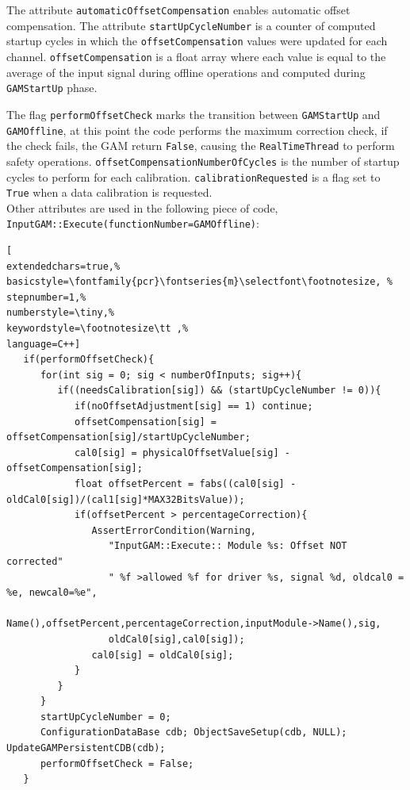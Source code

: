 The attribute \texttt{automaticOffsetCompensation} enables automatic offset compensation. The attribute \texttt{startUpCycleNumber} is a counter of computed startup cycles in which the \texttt{offsetCompensation} values were updated for each channel. \texttt{offsetCompensation} is a float array where each value is equal to the average of the input signal during offline operations and computed during \texttt{GAMStartUp} phase.

The flag \texttt{performOffsetCheck} marks the transition between \texttt{GAMStartUp} and \texttt{GAMOffline}, at this point the code performs the maximum correction check, if the check fails, the GAM return \texttt{False}, causing the \texttt{RealTimeThread} to perform safety operations. \texttt{offsetCompensationNumberOfCycles} is the number of startup cycles to perform for each calibration. \texttt{calibrationRequested} is a flag set to \texttt{True} when a data calibration is requested. \\


Other attributes are used in the following piece of code, \texttt{InputGAM::Execute(functionNumber=GAMOffline)}:

\begin{lstlisting}[
extendedchars=true,%
basicstyle=\fontfamily{pcr}\fontseries{m}\selectfont\footnotesize, %
stepnumber=1,%
numberstyle=\tiny,%
keywordstyle=\footnotesize\tt ,%
language=C++]
   if(performOffsetCheck){
      for(int sig = 0; sig < numberOfInputs; sig++){
         if((needsCalibration[sig]) && (startUpCycleNumber != 0)){ 
            if(noOffsetAdjustment[sig] == 1) continue;
            offsetCompensation[sig] = offsetCompensation[sig]/startUpCycleNumber;
            cal0[sig] = physicalOffsetValue[sig] - offsetCompensation[sig];
            float offsetPercent = fabs((cal0[sig] - oldCal0[sig])/(cal1[sig]*MAX32BitsValue));
            if(offsetPercent > percentageCorrection){
               AssertErrorCondition(Warning,
                  "InputGAM::Execute:: Module %s: Offset NOT corrected"
                  " %f >allowed %f for driver %s, signal %d, oldcal0 = %e, newcal0=%e",
                  Name(),offsetPercent,percentageCorrection,inputModule->Name(),sig,
                  oldCal0[sig],cal0[sig]);
               cal0[sig] = oldCal0[sig];
            }
         }
      }
      startUpCycleNumber = 0;
      ConfigurationDataBase cdb; ObjectSaveSetup(cdb, NULL); UpdateGAMPersistentCDB(cdb);
      performOffsetCheck = False;
   }
\end{lstlisting}

